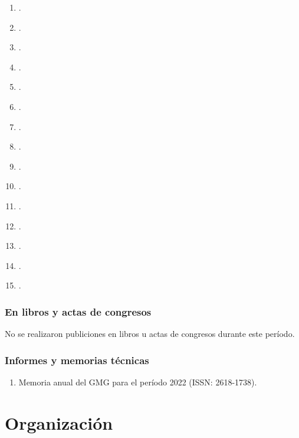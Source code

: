 \documentclass[a4paper,11pt,twoside,final,titlepage,onecolumn,openright]{report}
\begin{document}
\begin{enumerate}
    \item {}.
    \item {}.
    \item {}.
    \item {}.
    \item {}.
    \item {}.
    \item {}.
    \item {}.
    \item {}.
    \item {}.
    \item {}.
    \item {}.
    \item {}.
    \item {}.
    \item {}.
\end{enumerate}

\subsubsection{En libros y actas de congresos}

No se realizaron publiciones en libros u actas de congresos durante este período.

\subsubsection{Informes y memorias técnicas}
\begin{enumerate}
 \item Memoria anual del GMG para el período 2022 (ISSN: 2618-1738).
\end{enumerate}
\vspace{0.25cm}
\section{Organización}
\vspace{0.5cm}
\end{document}
